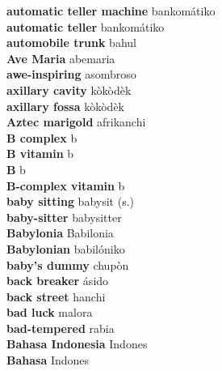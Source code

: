 \textbf{ automatic teller machine  } bankomátiko \\
\textbf{ automatic teller  } bankomátiko \\
\textbf{ automobile trunk  } bahul \\
\textbf{ Ave Maria  } abemaria \\
\textbf{ awe-inspiring  } asombroso \\
\textbf{ axillary cavity  } kòkòdèk \\
\textbf{ axillary fossa  } kòkòdèk \\
\textbf{ Aztec marigold  } afrikanchi \\
\textbf{ B complex  } b \\
\textbf{ B vitamin  } b \\
\textbf{ B  } b \\
\textbf{ B-complex vitamin  } b \\
\textbf{ baby sitting  } babysit (s.) \\
\textbf{ baby-sitter  } babysitter \\
\textbf{ Babylonia  } Babilonia \\
\textbf{ Babylonian  } babilóniko \\
\textbf{ baby’s dummy  } chupòn \\
\textbf{ back breaker  } ásido \\
\textbf{ back street  } hanchi \\
\textbf{ bad luck  } malora \\
\textbf{ bad-tempered  } rabia \\
\textbf{ Bahasa Indonesia  } Indones \\
\textbf{ Bahasa  } Indones \\
